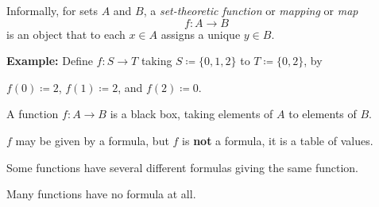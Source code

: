 \documentclass[10pt,aspectratio=149]{beamer}
\begin{document}
\begin{frame}
Informally, for sets $A$ and $B$,
a \emph{set-theoretic function} or \emph{mapping} or \emph{map}
\[
f \colon A \to B
\]
is an object that to each $x \in A$ assigns a unique $y \in B$.

\medskip
\pause
\textbf{Example:}
Define $f \colon S \to T$ taking $S \coloneqq \{ 0, 1, 2 \}$ to $T \coloneqq \{ 0, 2 \}$,
by

$f(0) \coloneqq 2$, $f(1) \coloneqq 2$, and $f(2) \coloneqq 0$.

\medskip
\pause

A function $f \colon A \to B$ is a black box,
taking elements of $A$ to elements of $B$.

\medskip
\pause

$f$ may be given by a formula, but $f$ is \textbf{not}
a formula, it is a table of values.

\pause
\medskip

Some functions have several different formulas giving the same function.

\pause
\medskip

Many functions have no formula at all.

\end{frame}
\end{document}
